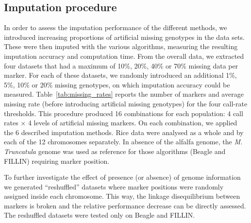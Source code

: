 \subsection{Imputation procedure}
\label{sec:imputation_procedure}
In order to assess the imputation performance of the different methods, we introduced increasing proportions of artificial missing genotypes in the data sets. These were then imputed with the various algorithms, measuring the resulting imputation accuracy and computation time. From the overall data, we extracted four datasets that had a maximum of 10\%, 20\%, 40\% or 70\% missing data per marker. For each of these datasets, we randomly introduced an additional 1\%, 5\%, 10\% or 20\% missing genotypes, on which imputation accuracy could be measured. Table~\ref{tab:missing_rates} reports the number of markers and average missing rate (before introducing artificial missing genotypes) for the four call-rate thresholds. This procedure produced 16 combinations for each population: 4 call rates $\times$ 4 levels of artificial missing markers. On each combination, we applied the 6 described imputation methods. Rice data were analysed as a whole and by each of the 12 chromosomes separately. In absence of the alfalfa genome, the \emph{M. Truncatula} genome was used as reference for those algorithms (Beagle and FILLIN) requiring marker position. 

To further investigate the effect of presence (or absence) of genome information we generated ``reshuffled'' datasets where marker positions were randomly assigned inside each chromosome. This way, the linkage disequilibrium between markers is broken and the relative performance decrease can be directly assessed. The reshuffled datasets were tested only on Beagle and FILLIN.  

